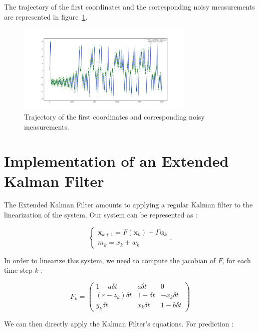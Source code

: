 \documentclass[english, DIV=13]{scrartcl}
\renewcommand{\vec}[1]{\mathbf{#1}}
\begin{document}
The trajectory of the first coordinates and the corresponding noisy measurements
are represented in figure~\ref{fig:q2-mes-vs-real}.

\begin{figure}[ht!]
    \centering
    \includegraphics[width=0.75\textwidth]{figures/q2-mes-vs-real}
    \caption{Trajectory of the first coordinates and corresponding noisy measurements.}
    \label{fig:q2-mes-vs-real}
\end{figure}


\section{Implementation of an Extended Kalman Filter}

The Extended Kalman Filter amounts to applying a regular Kalman filter to the linearization of the system. Our system can be represented as :


\begin{equation*}
    \begin{cases}
        \vec{x}_{k+1} = F(\vec{x}_k) + \Gamma\vec{u}_k \\
        m_k = x_k + w_k
    \end{cases}.
\end{equation*}

In order to linearize this system, we need to compute the jacobian of $F$, for each time step $k$ :

\begin{equation*}
F_k = 
    \begin{pmatrix}
        1 - a \delta t & a \delta t & 0 \\
        (r - z_k) \delta t & 1 - \delta t & - x_k \delta t \\
        y_k \delta t & x_k \delta t & 1 - b \delta t
    \end{pmatrix}
\end{equation*}

We can then directly apply the Kalman Filter's equations. For prediction :
\end{document}
